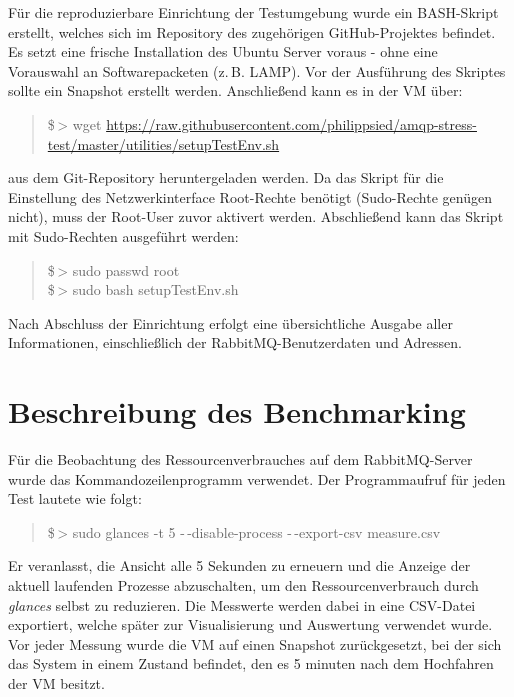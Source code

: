 \documentclass[	a4paper,
			11pt,
			oneside,
			parskip]{scrartcl}
\begin{document}
	Für die reproduzierbare Einrichtung der Testumgebung wurde ein BASH-Skript erstellt, welches sich im Repository des zugehörigen GitHub-Projektes befindet. Es setzt eine frische Installation 
	des Ubuntu Server voraus - ohne eine Vorauswahl an Softwarepacketen (z.\,B. LAMP). Vor der Ausführung des Skriptes sollte ein Snapshot erstellt werden. Anschließend kann es in der VM über:
	\begin{quote}
		\ttfamily 		
		\$\,> wget \url{https://raw.githubusercontent.com/philippsied/amqp-stress-test/master/utilities/setupTestEnv.sh}
	\end{quote}
	aus dem Git-Repository heruntergeladen werden. Da das Skript für die Einstellung des Netzwerkinterface Root-Rechte benötigt (Sudo-Rechte genügen nicht), muss der Root-User zuvor aktivert werden. Abschließend kann das Skript mit Sudo-Rechten ausgeführt werden:
	\begin{quote}
		\ttfamily 
		\$\,> sudo passwd root\\
		\$\,> sudo bash setupTestEnv.sh
	\end{quote}
	
	Nach Abschluss der Einrichtung erfolgt eine übersichtliche Ausgabe aller Informationen, einschließlich der RabbitMQ-Benutzerdaten und Adressen.

	



%	
%
\clearpage
\section*{Beschreibung des Benchmarking}
	
	Für die Beobachtung des Ressourcenverbrauches auf dem RabbitMQ-Server wurde das Kommandozeilenprogramm  verwendet. Der Programmaufruf für jeden Test lautete wie folgt:
	\begin{quote}
		\ttfamily
		\$\,> sudo glances -t 5 -\,-disable-process -\,-export-csv measure.csv
	\end{quote}
	Er veranlasst, die Ansicht alle 5 Sekunden zu erneuern und die Anzeige der aktuell laufenden Prozesse abzuschalten, um den Ressourcenverbrauch durch \textsl{glances} selbst zu reduzieren.
	Die Messwerte werden dabei in eine CSV-Datei exportiert, welche später zur Visualisierung und Auswertung verwendet wurde.
	Vor jeder Messung wurde die VM auf einen Snapshot zurückgesetzt, bei der sich das System in einem Zustand befindet, den es 5 minuten nach dem Hochfahren der VM besitzt.
	
\end{document}
